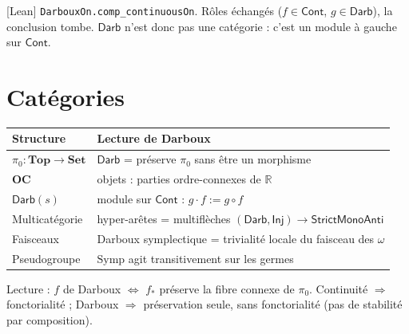 \documentclass[11pt,a4paper]{article}
\theoremstyle{plain}
\theoremstyle{definition}
\theoremstyle{remark}
\newcommand{\Darb}{\mathsf{Darb}}
\newcommand{\Cont}{\mathsf{Cont}}
\newcommand{\Inj}{\mathsf{Inj}}
\newcommand{\SMA}{\mathsf{StrictMonoAnti}}
\newcommand{\R}{\mathbb{R}}
\begin{document}
\begin{center}
\end{center}

\noindent \textsf{[Lean]} \texttt{DarbouxOn.comp\_continuousOn}. Rôles échangés
($f\in\Cont$, $g\in\Darb$), la conclusion tombe. $\Darb$ n'est donc pas une catégorie : c'est
un module à gauche sur $\Cont$.

\section{Catégories}

\begin{center}
\begin{tabular}{@{}ll@{}}
\toprule
Structure & Lecture de Darboux\\
\midrule
$\pi_0 : \mathbf{Top}\to\mathbf{Set}$ & $\Darb$ = \og{}préserve $\pi_0$\fg{} sans être un morphisme\\
$\mathbf{OC}$ & objets : parties ordre-connexes de $\R$\\
$\Darb(s)$ & module sur $\Cont$ : $g\cdot f := g\circ f$\\
Multicatégorie & hyper-arêtes = multiflèches $(\Darb,\Inj)\to \SMA$\\
Faisceaux & Darboux symplectique = trivialité locale du faisceau des $\omega$\\
Pseudogroupe & $\mathrm{Symp}$ agit transitivement sur les germes\\
\bottomrule
\end{tabular}
\end{center}

\begin{center}
\end{center}

\noindent Lecture : $f$ de Darboux $\iff$ $f_*$ préserve la fibre \og{}connexe\fg{} de $\pi_0$.
Continuité $\Rightarrow$ fonctorialité ; Darboux $\Rightarrow$ préservation seule, sans
fonctorialité (pas de stabilité par composition).
\end{document}
